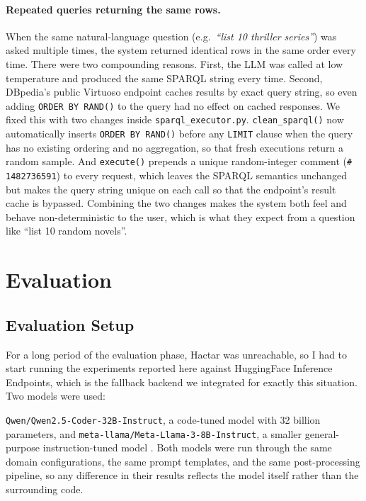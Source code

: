 \documentclass[11pt,a4paper]{article}
\begin{document}
\paragraph{Repeated queries returning the same rows.}
When the same natural-language question (e.g.\ \emph{``list 10
thriller series''}) was asked multiple times, the system returned
identical rows in the same order every time. There were two
compounding reasons. First, the LLM was called at low temperature
and produced the same SPARQL string every time. Second, DBpedia's
public Virtuoso endpoint caches results by exact query string, so
even adding \texttt{ORDER\,BY\,RAND()} to the query had no effect
on cached responses. We fixed this with two changes inside
\texttt{sparql\_executor.py}. \texttt{clean\_sparql()} now
automatically inserts \texttt{ORDER\,BY\,RAND()} before any
\texttt{LIMIT} clause when the query has no existing ordering and
no aggregation, so that fresh executions return a random sample.
And \texttt{execute()} prepends a unique random-integer comment
(\texttt{\#\,1482736591}) to every request, which leaves the SPARQL
semantics unchanged but makes the query string unique on each call
so that the endpoint's result cache is bypassed. Combining the two
changes makes the system both feel and behave non-deterministic to
the user, which is what they expect from a question like ``list 10
random novels''.

\section{Evaluation}
\label{sec:evaluation}

\subsection{Evaluation Setup}
\label{sec:eval-setup}
For a long period of the evaluation phase, Hactar was unreachable,
so I had to start running the experiments reported here against HuggingFace Inference
Endpoints, which is the fallback backend we integrated for exactly
this situation. Two models were used:

\texttt{Qwen/Qwen2.5-Coder-32B-Instruct}, a code-tuned model with
32 billion parameters, 
and \texttt{meta-llama/Meta-Llama-3-8B-Instruct},
a smaller general-purpose instruction-tuned model
\cite{touvron2023llama2}. Both models were run through the same
domain configurations, the same prompt templates, and the same
post-processing pipeline, so any difference in their results reflects
the model itself rather than the surrounding code.
\end{document}
